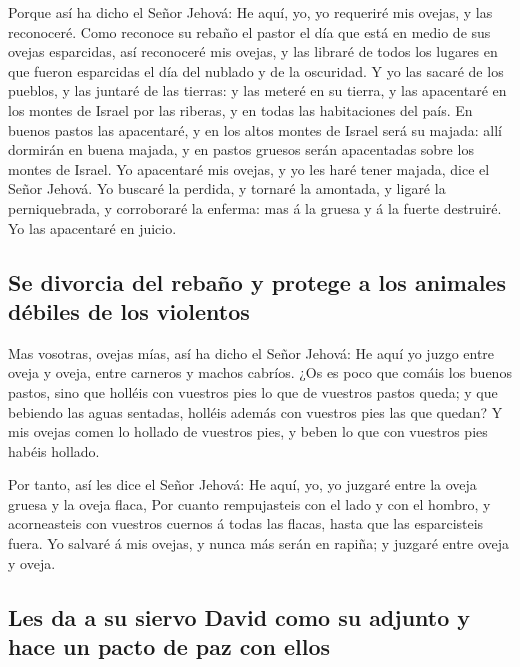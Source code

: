  Porque así ha dicho el Señor Jehová: He aquí, yo, yo
requeriré mis ovejas, y las reconoceré.  Como reconoce su
rebaño el pastor el día que está en medio de sus ovejas esparcidas, así
reconoceré mis ovejas, y las libraré de todos los lugares en que fueron
esparcidas el día del nublado y de la oscuridad.  Y yo las
sacaré de los pueblos, y las juntaré de las tierras: y las meteré en su
tierra, y las apacentaré en los montes de Israel por las riberas, y en
todas las habitaciones del país.  En buenos pastos las
apacentaré, y en los altos montes de Israel será su majada: allí
dormirán en buena majada, y en pastos gruesos serán apacentadas sobre
los montes de Israel.  Yo apacentaré mis ovejas, y yo les
haré tener majada, dice el Señor Jehová.  Yo buscaré la
perdida, y tornaré la amontada, y ligaré la perniquebrada, y corroboraré
la enferma: mas á la gruesa y á la fuerte destruiré. Yo las apacentaré
en juicio.

\hypertarget{se-divorcia-del-rebauxf1o-y-protege-a-los-animales-duxe9biles-de-los-violentos}{%
\subsection{Se divorcia del rebaño y protege a los animales débiles de
los
violentos}\label{se-divorcia-del-rebauxf1o-y-protege-a-los-animales-duxe9biles-de-los-violentos}}

 Mas vosotras, ovejas mías, así ha dicho el Señor Jehová:
He aquí yo juzgo entre oveja y oveja, entre carneros y machos cabríos.
 ¿Os es poco que comáis los buenos pastos, sino que holléis
con vuestros pies lo que de vuestros pastos queda; y que bebiendo las
aguas sentadas, holléis además con vuestros pies las que quedan?
 Y mis ovejas comen lo hollado de vuestros pies, y beben lo
que con vuestros pies habéis hollado.

 Por tanto, así les dice el Señor Jehová: He aquí, yo, yo
juzgaré entre la oveja gruesa y la oveja flaca,  Por cuanto
rempujasteis con el lado y con el hombro, y acorneasteis con vuestros
cuernos á todas las flacas, hasta que las esparcisteis fuera.
 Yo salvaré á mis ovejas, y nunca más serán en rapiña; y
juzgaré entre oveja y oveja.

\hypertarget{les-da-a-su-siervo-david-como-su-adjunto-y-hace-un-pacto-de-paz-con-ellos}{%
\subsection{Les da a su siervo David como su adjunto y hace un pacto de
paz con
ellos}\label{les-da-a-su-siervo-david-como-su-adjunto-y-hace-un-pacto-de-paz-con-ellos}}

